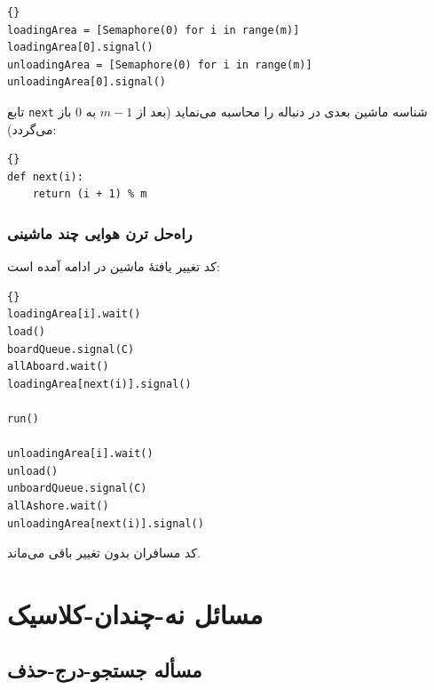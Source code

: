 \documentclass{book}
\newcommand{\clearemptydoublepage}{\newpage\cleardoublepage}
\begin{document}
\begin{latin}
\begin{lstlisting}[title=\rl{راهنمایی ترن هوایی چند ماشینی}]{}
loadingArea = [Semaphore(0) for i in range(m)]
loadingArea[0].signal()
unloadingArea = [Semaphore(0) for i in range(m)]
unloadingArea[0].signal()
\end{lstlisting}
\end{latin}

    تابع {\tt next}  شناسه ماشین بعدی در دنباله را محاسبه می‌نماید (بعد از $m-1$ به  $0$  باز می‌گردد):

\begin{latin}
\begin{lstlisting}[title=\rl{پیاده‌سازی  {\tt next}}]{}
def next(i):
    return (i + 1) % m
\end{lstlisting}
\end{latin}



\clearemptydoublepage
\subsection{راه‌حل ترن هوایی چند ماشینی}

    کد تغییر یافتهٔ ماشین در ادامه آمده است: 

\begin{latin}
\begin{lstlisting}[title=\rl{راه‌حل ترن هوایی  چند ماشینی (ماشین)}]{} 
loadingArea[i].wait()
load()
boardQueue.signal(C)
allAboard.wait()
loadingArea[next(i)].signal()

run()

unloadingArea[i].wait()
unload()
unboardQueue.signal(C)
allAshore.wait()
unloadingArea[next(i)].signal()
\end{lstlisting}
\end{latin}

    کد مسافران بدون تغییر باقی می‌ماند. 
    


\clearemptydoublepage
\chapter{مسائل نه-چندان-کلاسیک}


\section{مسأله جستجو-درج-حذف}
\end{document}
